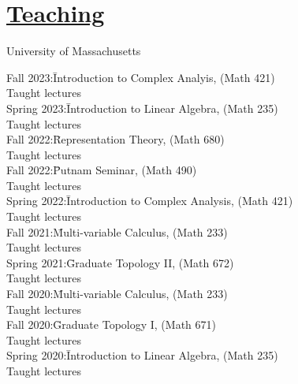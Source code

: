 \documentclass[11pt]{amsart}
\theoremstyle{plain}
\theoremstyle{definition}
\theoremstyle{remark}
\begin{document}
\section*{ {\Large\underline{Teaching}}}
\noindent University of Massachusetts
\begin{tabbing}



  
Fall 2023:\quad\quad\= Introduction to Complex Analyis, (Math 421)\\
\>Taught lectures \\

  
Spring 2023:\quad\quad\= Introduction to Linear Algebra, (Math 235)\\
\>Taught lectures \\




  
Fall 2022:\quad\quad\quad\= Representation Theory, (Math 680)\\
\>Taught lectures \\

  
Fall 2022:\quad\quad\quad\= Putnam Seminar, (Math 490)\\
\>Taught lectures \\


Spring 2022:\quad\quad\= Introduction to Complex Analysis, (Math 421)\\
\>Taught lectures \\


Fall 2021:\quad\quad\quad\= Multi-variable Calculus, (Math 233)\\
\>Taught lectures \\

  
Spring 2021:\quad\quad\= Graduate Topology II, (Math 672)\\
\>Taught lectures \\

  
Fall 2020:\quad\quad\quad\= Multi-variable Calculus, (Math 233)\\
\>Taught lectures \\

  
Fall 2020:\quad\quad\quad\= Graduate Topology I, (Math 671)\\
\>Taught lectures \\
  
  
Spring 2020:\quad\quad\= Introduction to Linear Algebra, (Math 235)\\
\>Taught lectures \\



\end{tabbing}
\end{document}
